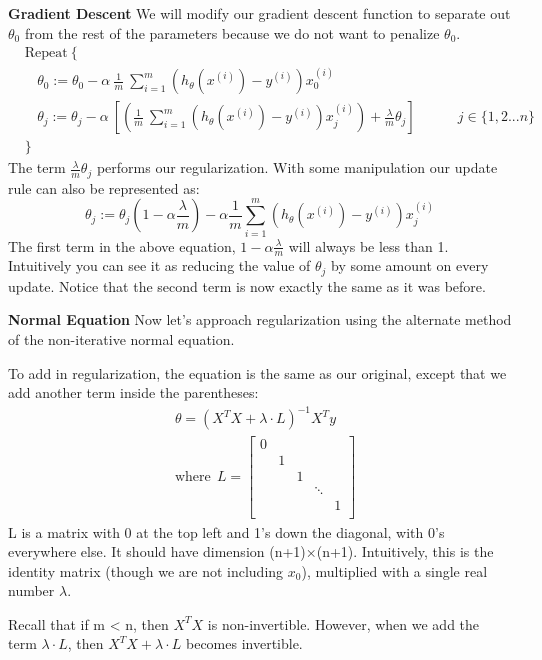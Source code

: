 \documentclass{article}
\begin{document}
\textbf{Gradient Descent}
We will modify our gradient descent function to separate out $\theta_0$ from the rest of the parameters because we do not want to penalize $\theta_0$.
\begin{align*} 
	& \text{Repeat}\ \lbrace \\ 
	& \ \ \ \ \theta_0 := \theta_0 - \alpha\ \frac{1}{m}\ \sum_{i=1}^m (h_\theta(x^{(i)}) - y^{(i)})x_0^{(i)} \\ 
	& \ \ \ \ \theta_j := \theta_j - \alpha\ \left[ \left( \frac{1}{m}\ \sum_{i=1}^m (h_\theta(x^{(i)}) - y^{(i)})x_j^{(i)} \right) + \frac{\lambda}{m}\theta_j \right] 
	&\ \ \ \ \ \ \ \ \ \ j \in \lbrace 1,2...n\rbrace\\ 
	& \rbrace 
\end{align*}
The term $\frac{\lambda}{m}\theta_j$ performs our regularization. With some manipulation our update rule can also be represented as:
$$\theta_j := \theta_j(1 - \alpha\frac{\lambda}{m}) - \alpha\frac{1}{m}\sum_{i=1}^m(h_\theta(x^{(i)}) - y^{(i)})x_j^{(i)}$$
The first term in the above equation, $1 - \alpha\frac{\lambda}{m}$ will always be less than 1. Intuitively you can see it as reducing the value of $\theta_j$ by some amount on every update. Notice that the second term is now exactly the same as it was before.

\textbf{Normal Equation}
Now let's approach regularization using the alternate method of the non-iterative normal equation.

To add in regularization, the equation is the same as our original, except that we add another term inside the parentheses:
\begin{align*}
	& \theta = \left( X^TX + \lambda \cdot L \right)^{-1} X^Ty \\
	& \text{where}\ \ L = 
		\begin{bmatrix} 
			0 & & & & \\
			& 1 & & & \\ 
			& & 1 & & \\ 
			& & & \ddots & \\ 
			& & & & 1 \\ 
		\end{bmatrix}
\end{align*}
L is a matrix with 0 at the top left and 1's down the diagonal, with 0's everywhere else. It should have dimension (n+1)×(n+1). Intuitively, this is the identity matrix (though we are not including $x_0$), multiplied with a single real number $\lambda$.

Recall that if m < n, then $X^TX$ is non-invertible. However, when we add the term $\lambda \cdot L$, then $X^TX + \lambda \cdot L$ becomes invertible.
\end{document}
